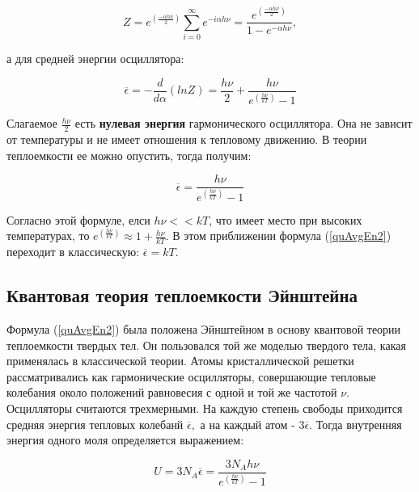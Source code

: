 \begin{equation}
    Z = e^{\left( \frac {-\alpha h\nu}{2} \right)} \displaystyle\sum_{i = 0}^{\infty} e^{-i\alpha h\nu} = \frac {e^{\left( \frac {-\alpha h\nu}{2} \right)}}{1 - e^{-\alpha h\nu}},
    \label{condSum}
\end{equation}

а для средней энергии осциллятора:

\begin{equation}
    \overline\epsilon = - \frac {d}{d\alpha} \left( ln Z \right) = \frac {h\nu}{2} + \frac {h\nu}{e^{\left( \frac {h\nu}{kT} \right)} - 1}
    \label{quAvgEn1}
\end{equation}

\newpage

Слагаемое $ \frac {h\nu}{2} $ есть \textbf {нулевая энергия} гармонического осциллятора. Она не зависит от температуры и \linebreak не имеет отношения к тепловому движению. В теории теплоемкости ее можно опустить, тогда получим:

\begin{equation}
    \overline\epsilon = \frac {h\nu}{e^{\left( \frac {h\nu}{kT} \right)} - 1}
    \label{quAvgEn2}
\end{equation}

Согласно этой формуле, елси $ h\nu << kT $, что имеет место при высоких температурах, то $ e^{\left( \frac {h\nu}{kT} \right)} \approx 1 + \frac {h\nu}{kT}$. В этом приближении формула (\ref {quAvgEn2}) переходит в классическую: $ \overline\epsilon = kT $.

\subsection {Квантовая теория теплоемкости Эйнштейна}

Формула (\ref {quAvgEn2}) была положена Эйнштейном в основу квантовой теории теплоемкости твердых тел. Он пользовался той же моделью твердого тела, какая применялась в классической теории. Атомы кристаллической решетки рассматривались как гармонические осцилляторы, совершающие тепловые колебания около положений равновесия с одной и той же частотой $ \nu $. Осцилляторы считаются трехмерными. На каждую степень свободы приходится средняя энергия  тепловых колебанй $ \overline\epsilon, $ а на каждый атом - $ 3\overline\epsilon $. Тогда внутренняя энергия одного моля определяется выражением:

\begin{equation}
    U = 3N_A\overline\epsilon = \frac {3N_Ah\nu}{e^{\left( \frac {h\nu}{kT} \right)} - 1}
    \label{molEn}
\end{equation}

